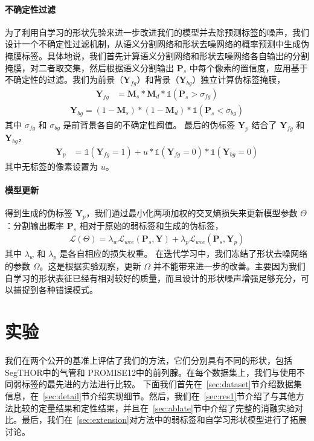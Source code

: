 \paragraph{不确定性过滤}
为了利用自学习的形状先验来进一步改进我们的模型并去除预测标签的噪声，我们设计一个不确定性过滤机制，从语义分割网络和形状去噪网络的概率预测中生成伪掩膜标签。具体地说，我们首先计算语义分割网络和形状去噪网络各自输出的分割掩膜，对二者取交集，然后根据语义分割输出 $\mathbf{P}_s$ 中每个像素的置信度，应用基于不确定性的过滤。我们为前景（$\mathbf{Y}_{fg}$）和背景（$\mathbf{Y}_{bg}$）独立计算伪标签掩膜，
\begin{align}   \label{eq1}
    \mathbf{Y}_{fg} &= \mathbf{M}_s * \mathbf{M}_d * \mathds{1} (\mathbf{P}_s > \sigma_{fg})
\end{align}
\begin{align}   \label{eq2}
    \mathbf{Y}_{bg} = (1-\mathbf{M}_s) * (1-\mathbf{M}_d) * \mathds{1} (\mathbf{P}_s < \sigma_{bg})
\end{align}
其中 $\sigma_{fg}$ 和 $\sigma_{bg}$ 是前背景各自的不确定性阈值。
最后的伪标签 $\mathbf{Y}_p$ 结合了 $\mathbf{Y}_{fg}$ 和 $\mathbf{Y}_{bg}$，
\begin{align}
    \mathbf{Y}_p &= \mathds{1}(\mathbf{Y}_{fg} = 1) + u * \mathds{1}(\mathbf{Y}_{fg} = 0) * \mathds{1}(\mathbf{Y}_{bg} = 0)
\end{align}
其中无标签的像素设置为 $u$。

\paragraph{模型更新}
得到生成的伪标签 $\mathbf{Y}_p$，我们通过最小化两项加权的交叉熵损失来更新模型参数 $\Theta$ ：分割输出概率 $\mathbf{P}_s$ 相对于原始的弱标签和生成的伪标签，
\begin{align} \label{eq3}
    \mathcal{L} (\Theta) = \lambda_w \mathcal{L}_{wce} (\mathbf{P}_s, \mathbf{Y}) + \lambda_p \mathcal{L}_{wce} (\mathbf{P}_s, \mathbf{Y}_p)
\end{align}
其中 $\lambda_w$ 和 $\lambda_p$ 是各自相应的损失权重。
在迭代学习中，我们冻结了形状去噪网络的参数 $\Omega$。这是根据实验观察，更新 $\Omega$ 并不能带来进一步的改善。主要因为我们自学习的形状表征已经有相对较好的质量，而且设计的形状噪声增强足够充分，可以捕捉到各种错误模式。


\section{实验}
我们在两个公开的基准上评估了我们的方法，它们分别具有不同的形状，包括 SegTHOR\citep{trullo2019multiorgan}中的气管和 PROMISE12\citep{Litjens2014EvaluationOP}中的前列腺。在每个数据集上，我们与使用不同弱标签的最先进的方法进行比较。
下面我们首先在~\ref{sec:dataset}节介绍数据集信息，在~\ref{sec:detail}节介绍实现细节。然后，我们在~\ref{sec:res1}节介绍了与其他方法比较的定量结果和定性结果，并且在~\ref{sec:ablate}节中介绍了完整的消融实验对比。最后，我们在~\ref{sec:extension}对方法中的弱标签和自学习形状模型进行了拓展讨论。

